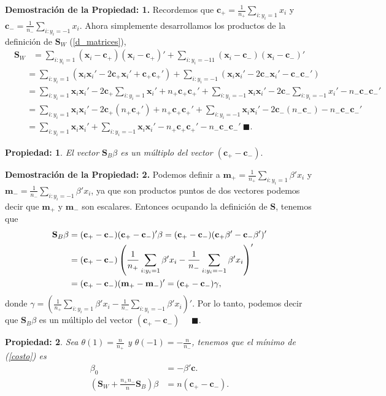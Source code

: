 \documentclass[paper=letter, fontsize=11pt]{scrartcl}
\newcommand{\fin}{$\blacksquare.$}
\newcommand{\finf}{\blacksquare.}
\newtheorem{thmp}{Propiedad:}
\newcommand{\Sb}{\mathbf{S}}
\newcommand{\mb}{\mathbf{m}}
\newcommand{\cb}{\mathbf{c}}
\newcommand{\xb}{\mathbf{x}}
\numberwithin{equation}{section} %
\numberwithin{figure}{section} %
\numberwithin{table}{section} %
\begin{document}
\textbf{Demostración de la Propiedad: 1.} Recordemos que $\cb_{+}=\frac{1}{n_+}\sum_{i:y_i=1}x_i$ y $\cb_{-}=\frac{1}{n_-}\sum_{i:y_i=-1}x_i$. Ahora simplemente desarrollamos los productos de la definición de $\Sb_W$ (\ref{d_matrices}),
\begin{align*}
    \Sb_W &=\sum_{i:y_i=1}(\xb_i-\cb_+)(\xb_i-\cb_+)'+\sum_{i:y_i=-11}(\xb_i-\cb_-)(\xb_i-\cb_-)'
\end{align*}
\begin{align*}
\ \ \ \ \ \ &= \sum_{i:y_i=1}\left(\xb_i\xb_i'-2\cb_+\xb_i'+\cb_+\cb_+'\right)+\sum_{i:y_i=-1}\left(\xb_i\xb_i'-2\cb_-\xb_i'-\cb_-\cb_-'\right)\\
    &=\sum_{i:y_i=1}\xb_i\xb_i'-2\cb_+\sum_{i:y_i=1}\xb_i'+n_+\cb_+\cb_+'+\sum_{i:y_i=-1}\xb_i\xb_i'-2\cb_-\sum_{i:y_i=-1}x_i'-n_-\cb_-\cb_-'\\
    &=\sum_{i:y_i=1}\xb_i\xb_i'-2\cb_+(n_+\cb_+')+n_+\cb_+\cb_+'+\sum_{i:y_i=-1}\xb_i\xb_i'-2\cb_-(n_-\cb_-)-n_-\cb_-\cb_-'\\
    &= \sum_{i:y_i=1}\xb_i\xb_i'+\sum_{i:y_i=-1}\xb_i\xb_i'-n_+\cb_+\cb_+'-n_-\cb_-\cb_-' \ \finf
\end{align*}
\begin{framed}
    \begin{thmp} 
    \label{sb}
    El vector $\Sb_B\beta$ es un múltiplo del vector $(\cb_+-\cb_-).$
    \end{thmp}
\end{framed}
\textbf{Demostración de la Propiedad: 2.} Podemos definir a $\mb_+=\frac{1}{n_+}\sum_{i:y_i=1}\beta'x_i$ y $\mb_-=\frac{1}{n_-}\sum_{i:y_i=-1}\beta'x_i$, ya que son productos puntos de dos vectores podemos decir que $\mb_+$ y $\mb_-$ son escalares. Entonces ocupando la definición de $\Sb$, tenemos que
\begin{align*}
   \Sb_B\beta&= (\cb_+-\cb_-)(\cb_+-\cb_-)'\beta=(\cb_+-\cb_-)(\cb_+\beta'-\cb_-\beta')'\\
   &=(\cb_+-\cb_-)\left(\frac{1}{n_+}\sum_{i:y_i=1}\beta'x_i-\frac{1}{n_-}\sum_{i:y_i=-1}\beta'x_i\right)'\\
   &=(\cb_+-\cb_-)(\mb_+-\mb_-)'=(\cb_+-\cb_-)\bf{\gamma},
\end{align*}
donde $\gamma=\left(\frac{1}{n_+}\sum_{i:y_i=1}\beta'x_i-\frac{1}{n_-}\sum_{i:y_i=-1}\beta'x_i\right)'.$ Por lo tanto, podemos decir que $\Sb_B\beta$ es un múltiplo del vector $(\cb_+-\cb_-)$ \ \ \fin
\begin{framed}
    \begin{thmp} 
    \label{sb}
    Sea $\theta(1)=\frac{n}{n_+}$ y $\theta(-1)=-\frac{n}{n_-}$, tenemos que el mínimo de (\ref{costo}) es
    \begin{align*}
        \beta_0&=-\beta'\cb.\\
        \left(\Sb_W+\frac{n_+n_-}{n}\Sb_B \right)\beta &=n(\cb_+-\cb_-).
    \end{align*}
    \end{thmp}
\end{framed}
\end{document}
